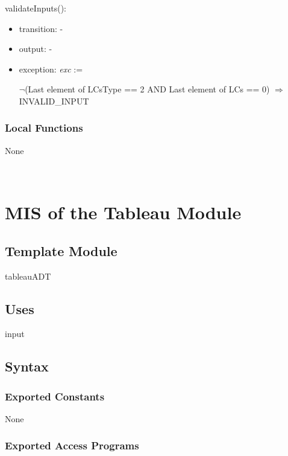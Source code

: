 \documentclass[12pt, titlepage]{article}
\begin{document}
\noindent 
validateInputs():
\begin{itemize}
	\item transition: -
	\item output: -
	\item exception: \textit{exc} := 
	
	$\neg$(Last element of LCsType == 2 AND  Last element of LCs == 0) 
	$\Rightarrow$ INVALID{\_}INPUT \\
	
	
\end{itemize}

\subsubsection{Local Functions}

None

~\newpage

\section{MIS of the Tableau Module} \label{M_} 

\subsection{Template Module}

tableauADT

\subsection{Uses}

input

\subsection{Syntax}

\subsubsection{Exported Constants}

None

\subsubsection{Exported Access Programs}
\end{document}
